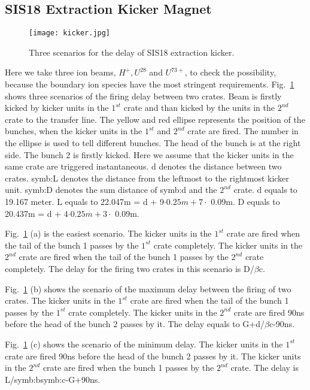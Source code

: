 \subsection{SIS18 Extraction Kicker Magnet}
\begin{figure}[H]
   \centering   
   \texttt{[image: kicker.jpg]}
   \caption{Three scenarios for the delay of SIS18 extraction kicker.}
   \label{kicker}
\end{figure}
Here we take three ion beams, $H^+, U^{28}$ and $U^{73+}$, to check the possibility, because the boundary ion species have the most stringent requirements. Fig.~\ref{kicker} shows three scenarios of the firing delay between two crates. Beam is firstly kicked by kicker units in the $1^{st}$ crate and than kicked by the units in the $2^{nd}$ crate to the transfer line. The yellow and red ellipse represents the position of the bunches, when the kicker units in the $1^{st}$ and $2^{nd}$ crate are fired. The number in the ellipse is used to tell different bunches. The head of the bunch is at the right side. The bunch 2 is firstly kicked. Here we assume that the kicker units in the same crate are triggered instantaneous. d denotes the distance between two crates. \gls{symb:L} denotes the distance from the leftmost to the rightmost kicker unit. \gls{symb:D} denotes the sum distance of \gls{symb:d} and the $2^{nd}$ crate. d equals to 19.167 meter. L equals to 22.047m = d + 9$\cdot 0.25m + 7\cdot$ 0.09m. D equals to 20.437m = d + 4$\cdot 0.25m + 3\cdot$ 0.09m.

Fig.~\ref{kicker} (a) is the easiest scenario. The kicker units in the $1^{st}$ crate are fired when the tail of the bunch 1 passes by the $1^{st}$ crate completely. The kicker units in the $2^{nd}$ crate are fired when the tail of the bunch 1 passes by the $2^{nd}$ crate completely. The delay for the firing two crates in this scenario is D/$\beta$c. 

Fig.~\ref{kicker} (b) shows the scenario of the maximum delay between the firing of two crates. The kicker units in the $1^{st}$ crate are fired when the tail of the bunch 1 passes by the $1^{st}$ crate completely. The kicker units in the $2^{nd}$ crate are fired 90ns before the head of the bunch 2 passes by it. The delay equals to G+d/$\beta$c-90ns.

Fig.~\ref{kicker} (c) shows the scenario of the minimum delay. The kicker units in the $1^{st}$ crate are fired 90ns before the head of the bunch 2 passes by it. The kicker units in the $2^{nd}$ crate are fired when the bunch 1 passes by the $2^{nd}$ crate. The delay is L/\gls{symb:b}\gls{symb:c}-G+90ns.



